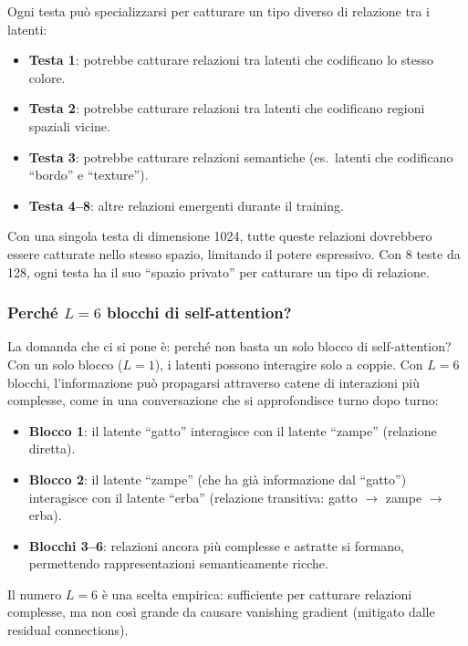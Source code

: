 \documentclass[12pt,a4paper]{article}
\begin{document}
\begin{notabox}
Ogni testa pu\`o specializzarsi per catturare un tipo diverso di relazione tra i latenti:
\begin{itemize}
    \item \textbf{Testa 1}: potrebbe catturare relazioni tra latenti che codificano lo stesso colore.
    \item \textbf{Testa 2}: potrebbe catturare relazioni tra latenti che codificano regioni spaziali vicine.
    \item \textbf{Testa 3}: potrebbe catturare relazioni semantiche (es.\ latenti che codificano ``bordo'' e ``texture'').
    \item \textbf{Testa 4--8}: altre relazioni emergenti durante il training.
\end{itemize}
Con una singola testa di dimensione 1024, tutte queste relazioni dovrebbero essere catturate nello stesso spazio, limitando il potere espressivo. Con 8 teste da 128, ogni testa ha il suo ``spazio privato'' per catturare un tipo di relazione.
\end{notabox}

\subsubsection{Perch\'e $L = 6$ blocchi di self-attention?}

La domanda che ci si pone \`e: perch\'e non basta un solo blocco di self-attention? Con un solo blocco ($L = 1$), i latenti possono interagire solo a coppie. Con $L = 6$ blocchi, l'informazione pu\`o propagarsi attraverso catene di interazioni pi\`u complesse, come in una conversazione che si approfondisce turno dopo turno:
\begin{itemize}
    \item \textbf{Blocco 1}: il latente ``gatto'' interagisce con il latente ``zampe'' (relazione diretta).
    \item \textbf{Blocco 2}: il latente ``zampe'' (che ha gi\`a informazione dal ``gatto'') interagisce con il latente ``erba'' (relazione transitiva: gatto $\to$ zampe $\to$ erba).
    \item \textbf{Blocchi 3--6}: relazioni ancora pi\`u complesse e astratte si formano, permettendo rappresentazioni semanticamente ricche.
\end{itemize}
Il numero $L = 6$ \`e una scelta empirica: sufficiente per catturare relazioni complesse, ma non cos\`i grande da causare vanishing gradient (mitigato dalle residual connections).
\end{document}
